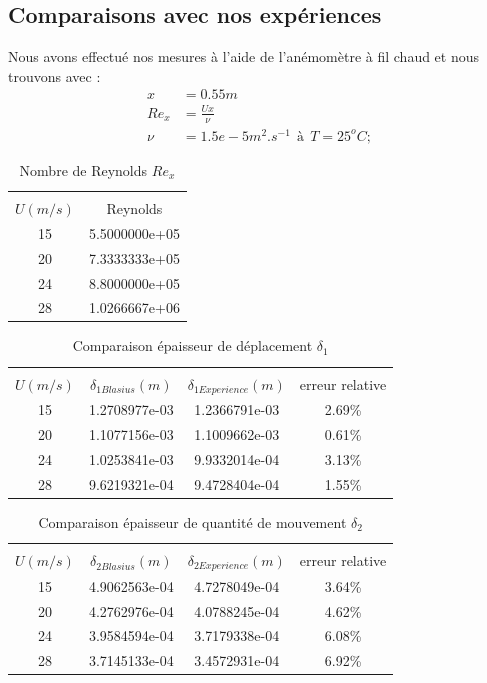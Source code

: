 \documentclass[french]{article}
\begin{document}
\subsection{Comparaisons avec nos expériences}
Nous avons effectué nos mesures à l'aide de l'anémomètre à fil chaud et nous trouvons avec :
\begin{align*}
	x &= 0.55m\\
	Re_{x} &= \frac{Ux}{\nu}\\
	\nu &= 1.5e-5 m^{2}.s^{-1}~~\text{à}~~T = 25^{o}C; 
\end{align*}
\begin{table}[ht]
	\centering
	\begin{tabular}{cc}
		\hline\\
		$U(m/s)$ & Reynolds\\
		\hline
   15 & 5.5000000e+05\\
   20 & 7.3333333e+05\\
   24 & 8.8000000e+05\\
   28 & 1.0266667e+06
	\end{tabular}
	\caption{Nombre de Reynolds $Re_{x}$}
\end{table}
\begin{table}[ht]
	\centering
	\begin{tabular}{cccc}
		\hline\\
		$U(m/s)$ & $\delta_{1Blasius}(m)$ &
		$ \delta_{1Experience}(m)$ & 
		 erreur relative\\
		\hline
		15   & 1.2708977e-03   & 1.2366791e-03   & 2.69\%\\
		20   & 1.1077156e-03   & 1.1009662e-03   & 0.61\%\\
		24   & 1.0253841e-03   & 9.9332014e-04   & 3.13\%\\
		28   & 9.6219321e-04   & 9.4728404e-04   & 1.55\%
	\end{tabular}
	\caption{Comparaison épaisseur de déplacement $\delta_{1}$}
\end{table}
\begin{table}[ht]
	\centering
	\begin{tabular}{cccc}
		\hline\\
		$U(m/s)$ & $\delta_{2Blasius}(m)$ &
		$ \delta_{2Experience}(m)$ & 
		 erreur relative\\
		\hline
   15 & 4.9062563e-04   & 4.7278049e-04   & 3.64\%\\
   20 & 4.2762976e-04   & 4.0788245e-04   & 4.62\%\\
   24 & 3.9584594e-04   & 3.7179338e-04   & 6.08\%\\
   28 & 3.7145133e-04   & 3.4572931e-04   & 6.92\%
	\end{tabular}
	\caption{Comparaison épaisseur de quantité de mouvement $\delta_{2}$}
\end{table}
\end{document}
